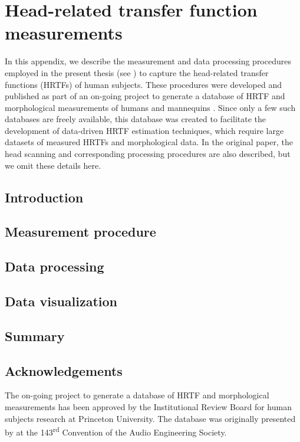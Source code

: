 \chapter{Head-related transfer function measurements}\label{chap:A4_HRTF_Measurements}
In this appendix, we describe the measurement and data processing procedures employed in the present thesis (see ) to capture the head-related transfer functions (HRTFs) of human subjects.
These procedures were developed and published as part of an on-going project to generate a database of HRTF and morphological measurements of humans and mannequins \citep{Sridhar2017}.
Since only a few such databases are freely available, this database was created to facilitate the development of data-driven HRTF estimation techniques, which require large datasets of measured HRTFs and morphological data.
In the original paper, the head scanning and corresponding processing procedures are also described, but we omit these details here.

\section{Introduction}\label{sec:A4_HRTF_Measurements:Introduction}


\section{Measurement procedure}\label{sec:A4_HRTF_Measurements:Measurement_Procedure}


\section{Data processing}\label{sec:A4_HRTF_Measurements:Data_Processing}


\section{Data visualization}\label{sec:A4_HRTF_Measurements:Data_Visualization}


\section{Summary}\label{sec:A4_HRTF_Measurements:Summary}


\section*{Acknowledgements}
The on-going project to generate a database of HRTF and morphological measurements has been approved by the Institutional Review Board for human subjects research at Princeton University.
The database was originally presented by \citet{Sridhar2017} at the 143\textsuperscript{rd} Convention of the Audio Engineering Society.